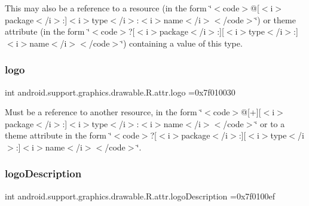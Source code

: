This may also be a reference to a resource (in the form \char`\"{}$<$code$>$@\mbox{[}$<$i$>$package$<$/i$>$\+:\mbox{]}$<$i$>$type$<$/i$>$\+:$<$i$>$name$<$/i$>$$<$/code$>$\char`\"{}) or theme attribute (in the form \char`\"{}$<$code$>$?\mbox{[}$<$i$>$package$<$/i$>$\+:\mbox{]}\mbox{[}$<$i$>$type$<$/i$>$\+:\mbox{]}$<$i$>$name$<$/i$>$$<$/code$>$\char`\"{}) containing a value of this type. \mbox{\label{classandroid_1_1support_1_1graphics_1_1drawable_1_1R_1_1attr_ad69b32b28458b691063de4943a44ad22}} 
\subsubsection{\texorpdfstring{logo}{logo}}
{\footnotesize\ttfamily int android.\+support.\+graphics.\+drawable.\+R.\+attr.\+logo =0x7f010030\hspace{0.3cm}{\ttfamily [static]}}

Must be a reference to another resource, in the form \char`\"{}$<$code$>$@\mbox{[}+\mbox{]}\mbox{[}$<$i$>$package$<$/i$>$\+:\mbox{]}$<$i$>$type$<$/i$>$\+:$<$i$>$name$<$/i$>$$<$/code$>$\char`\"{} or to a theme attribute in the form \char`\"{}$<$code$>$?\mbox{[}$<$i$>$package$<$/i$>$\+:\mbox{]}\mbox{[}$<$i$>$type$<$/i$>$\+:\mbox{]}$<$i$>$name$<$/i$>$$<$/code$>$\char`\"{}. \mbox{\label{classandroid_1_1support_1_1graphics_1_1drawable_1_1R_1_1attr_aadbf0b7bd04bedc28b0f0c8375db17b9}} 
\subsubsection{\texorpdfstring{logo\+Description}{logoDescription}}
{\footnotesize\ttfamily int android.\+support.\+graphics.\+drawable.\+R.\+attr.\+logo\+Description =0x7f0100ef\hspace{0.3cm}{\ttfamily [static]}}

